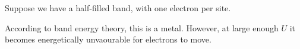 \documentclass[12pt,a4paper,titlepage]{article}
\begin{document}
Suppose we have a half-filled band, with one electron per site.
\begin{center}
\end{center}
According to band energy theory, this is a metal. However, at large enough $U$ it becomes energetically unvaourable for electrons to move.

\begin{center}
\begin{tikzpicture}
\end{tikzpicture}
\end{center}
\end{document}
